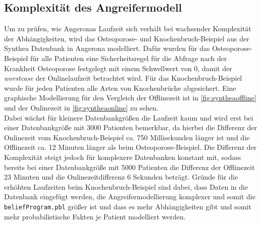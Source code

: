 \documentclass[german,version-2020-11]{uzl-thesis}
\begin{document}
\subsection{Komplexität des Angreifermodell}
Um zu prüfen, wie Angeronas Laufzeit sich verhält bei wachsender Komplexität der Abhängigkeiten, wird das Osteoporose- und Knochenbruch-Beispiel aus der Synthea Datenbank in Angerona modelliert. Dafür wurden für das Osteoporose-Beispiel für alle Patienten eine Sicherheitsregel für die Abfrage nach der Krankheit Osteoporose festgelegt mit einem Schwellwert von 0, damit der \emph{worstcase} der Onlinelaufzeit betrachtet wird. Für das Knochenbruch-Beispiel wurde für jeden Patienten alle Arten von Knochenbrüche abgesichert. Eine graphische Modellierung für den Vergleich der Offlinezeit ist in \autoref{fig:syntheaoffline} und der Onlinezeit in \autoref{fig:syntheaonline} zu sehen.\\  Dabei wächst für kleinere Datenbankgrößen die Laufzeit kaum und wird erst bei einer Datenbankgröße mit 3000 Patienten bemerkbar, da hierbei die Differenz der Onlinezeit vom Knochenbruch-Beispiel ca. 750 Millisekunden länger ist und die Offlinezeit ca. 12 Minuten länger als beim Osteoporose-Beispiel. Die Differenz der Komplexität steigt jedoch für komplexere Datenbanken konstant mit, sodass bereits bei einer Datenbankgröße mit 5000 Patienten die Differenz der Offlinezeit 23 Minuten und die Onlinezeitdifferenz 6 Sekunden beträgt.
Gründe für die erhöhten Laufzeiten beim Knochenbruch-Beispiel sind dabei, dass Daten in die Datenbank eingefügt werden, die Angreifermodellierung komplexer und somit die \texttt{beliefProgram.pbl} größer ist und dass es mehr Abhängigkeiten gibt und somit mehr probabilistische Fakten je Patient modelliert werden.  
\end{document}
